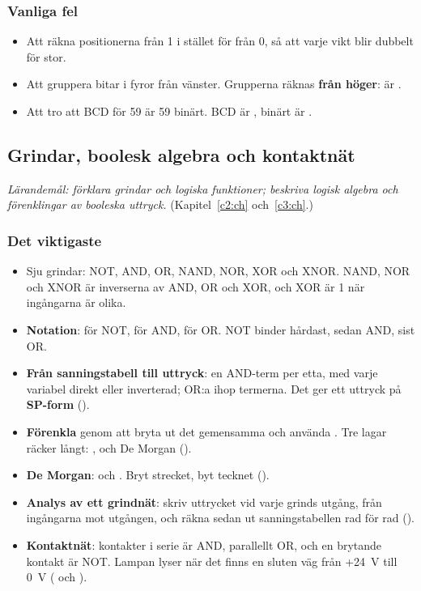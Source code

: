 \subsubsection{Vanliga fel}
\begin{itemize}
  \item Att räkna positionerna från 1 i stället för från 0, så att varje vikt blir dubbelt för
    stor.
  \item Att gruppera bitar i fyror från vänster. Grupperna räknas \textbf{från höger}: 
    är .
  \item Att tro att BCD för 59 är 59 binärt. BCD är , binärt är .
\end{itemize}

\subsection{Grindar, boolesk algebra och kontaktnät}
\label{c12:a3}
\emph{Lärandemål: förklara grindar och logiska funktioner; beskriva logisk algebra och förenklingar
av booleska uttryck.} (Kapitel~\ref{c2:ch} och~\ref{c3:ch}.)

\subsubsection{Det viktigaste}
\begin{itemize}
  \item Sju grindar: NOT, AND, OR, NAND, NOR, XOR och XNOR. NAND, NOR och XNOR är inverserna av AND,
    OR och XOR, och XOR är 1 när ingångarna är olika.
  \item \textbf{Notation}:  för NOT,  för AND,  för OR. NOT binder
    hårdast, sedan AND, sist OR.
  \item \textbf{Från sanningstabell till uttryck}: en AND-term per etta, med varje variabel direkt
    eller inverterad; OR:a ihop termerna. Det ger ett uttryck på \textbf{SP-form}
    ().
  \item \textbf{Förenkla} genom att bryta ut det gemensamma och använda . Tre lagar
    räcker långt: ,  och De Morgan ().
  \item \textbf{De Morgan}:  och . Bryt strecket, byt
    tecknet ().
  \item \textbf{Analys av ett grindnät}: skriv uttrycket vid varje grinds utgång, från ingångarna
    mot utgången, och räkna sedan ut sanningstabellen rad för rad ().
  \item \textbf{Kontaktnät}: kontakter i serie är AND, parallellt OR, och en brytande kontakt är
    NOT. Lampan lyser när det finns en sluten väg från +24~V till 0~V ( och
    ).
\end{itemize}

